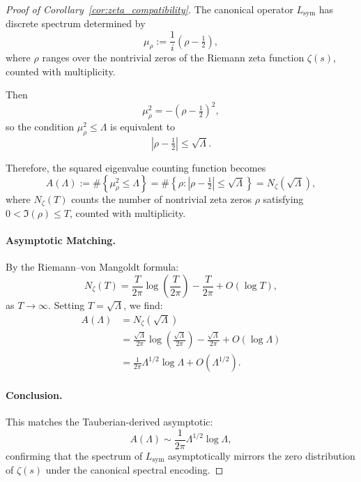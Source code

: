 \begin{proof}[Proof of Corollary~\ref{cor:zeta_compatibility}]
The canonical operator \( L_{\mathrm{sym}} \) has discrete spectrum determined by
\[
\mu_\rho := \frac{1}{i} \left( \rho - \tfrac{1}{2} \right),
\]
where \( \rho \) ranges over the nontrivial zeros of the Riemann zeta function \( \zeta(s) \), counted with multiplicity.

Then
\[
\mu_\rho^2 = -(\rho - \tfrac{1}{2})^2,
\]
so the condition \( \mu_\rho^2 \le \Lambda \) is equivalent to
\[
|\rho - \tfrac{1}{2}| \le \sqrt{\Lambda}.
\]

Therefore, the squared eigenvalue counting function becomes
\[
A(\Lambda) := \#\left\{ \mu_\rho^2 \le \Lambda \right\}
= \#\left\{ \rho : |\rho - \tfrac{1}{2}| \le \sqrt{\Lambda} \right\}
= N_\zeta(\sqrt{\Lambda}),
\]
where \( N_\zeta(T) \) counts the number of nontrivial zeta zeros \( \rho \) satisfying \( 0 < \Im(\rho) \le T \), counted with multiplicity.

\paragraph{Asymptotic Matching.}
By the Riemann--von Mangoldt formula:
\[
N_\zeta(T) = \frac{T}{2\pi} \log\left( \frac{T}{2\pi} \right) - \frac{T}{2\pi} + O(\log T),
\]
as \( T \to \infty \). Setting \( T = \sqrt{\Lambda} \), we find:
\[
\begin{aligned}
A(\Lambda) &= N_\zeta(\sqrt{\Lambda}) \\
&= \frac{\sqrt{\Lambda}}{2\pi} \log\left( \frac{\sqrt{\Lambda}}{2\pi} \right) - \frac{\sqrt{\Lambda}}{2\pi} + O(\log \Lambda) \\
&= \frac{1}{2\pi} \Lambda^{1/2} \log \Lambda + O(\Lambda^{1/2}).
\end{aligned}
\]

\paragraph{Conclusion.}
This matches the Tauberian-derived asymptotic:
\[
A(\Lambda) \sim \frac{1}{2\pi} \Lambda^{1/2} \log \Lambda,
\]
confirming that the spectrum of \( L_{\mathrm{sym}} \) asymptotically mirrors the zero distribution of \( \zeta(s) \) under the canonical spectral encoding.
\end{proof}
